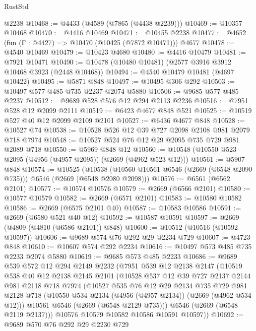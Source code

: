 \begin{lexlean}{RustStd}
\begin{coremodule}
    @2238
@10468 := @4433 (@4589 (@7865 (@4438 @2239)))
@10469 := @10357 @10468
@10470 := @4416 @10469
@10471 := @10455 @2238
@10477 := @4652 (fun (Γ : @4427) => @10470 (@10425 (@7872 @10471))) @4677
@10478 := @4540 @10469
@10479 := @10423 @4680
@10480 := @4416 @10479
@10481 := @7921 @10471
@10490 := @10478 (@10480 @10481) (@2577 @3916 @3912 @10468 @3923 (@2448 @10468))
@10494 := @4540 @10479 @10481 (@4697 @10422)
@10495 := @5871 @848
@10497 := @10495 @306 @292
@10503 := @10497 @577 @485 @735 @2237 @2074 @5880
@10506 := @9685 @577 @485 @2237
@10512 := @9689 @528 @576 @12 @294 @2113 @2236
@10516 := @7951 @528 @12 @2099 @2111
@10519 := @6423 @4677 @848 @521
@10525 := @10519 @527 @40 @12 @2099 @2109 @2101
@10527 := @6436 @4677 @848
@10528 := @10527 @74
@10538 := @10528 @526 @12 @39 @727 @2098 @2108 @981 @2079 @718 @7974
@10548 := @10527 @524 @76 @12 @29 @2095 @735 @729 @981 @2089 @718
@10550 := @5969 @848 @12
@10560 := @10548 (@10550 @523 @2095 (@4956 (@4957 @2095)) (@2669 (@4962 @523 @12)))
@10561 := @5907 @848
@10574 := @10525
    (@10538 (@10560 @10561 @6546 (@2669 (@6548 @2090 @735))) @6546 (@2669 (@6548 @2080 @2098)))
@10576 := @6561 (@6562 @2101)
@10577 := @10574 @10576
@10579 := @2669 (@6566 @2101)
@10580 := @10577 @10579
@10582 := @2669 (@6571 @2101)
@10583 := @10580 @10582
@10586 := @2669 (@6575 @2101 @40)
@10587 := @10583 @10586
@10591 := @2669 (@6580 @521 @40 @12)
@10592 := @10587 @10591
@10597 := @2669 (@4809 (@4810 (@6586 @2101)) @848)
@10600 := @10512 (@10516 (@10592 @10597))
@10606 := @9689 @574 @76 @292 @29 @2234 @729
@10607 := @4723 @848
@10610 := @10607 @574 @292 @2234
@10616 := @10497 @573 @485 @735 @2233 @2074 @5880
@10619 := @9685 @573 @485 @2233
@10686 := @9689
    @539
    @572
    @12
    @294
    @2149
    @2232
    (@7951
      @539
      @12
      @2138
      @2147
      (@10519
        @538
        @40
        @12
        @2138
        @2145
        @2101
        (@10528
          @537
          @12
          @39
          @727
          @2137
          @2144
          @981
          @2118
          @718
          @7974
          (@10527
            @535
            @76
            @12
            @29
            @2134
            @735
            @729
            @981
            @2128
            @718
            (@10550 @534 @2134 (@4956 (@4957 @2134)) (@2669 (@4962 @534 @12)))
            @10561
            @6546
            (@2669 (@6548 @2129 @735)))
          @6546
          (@2669 (@6548 @2119 @2137)))
        @10576
        @10579
        @10582
        @10586
        @10591
        @10597))
@10692 := @9689 @570 @76 @292 @29 @2230 @729

\end{coremodule}
\end{lexlean}
